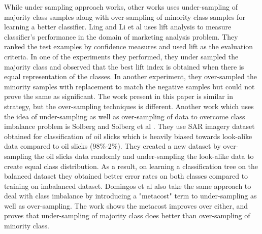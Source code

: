 \documentclass[10pt,journal,compsoc]{IEEEtran}
\begin{document}
While under sampling approach works, other works uses under-sampling of majority class samples along with over-sampling of minority class samples for learning a better classifier.
Ling and Li et al \cite{ll98} uses lift analysis to measure classifier's performance in the domain of marketing analysis problem.
They ranked the test examples by confidence measures and used lift as the evaluation criteria.
In one of the experiments they performed, they under sampled the majority class and observed that the best lift index is obtained when there is equal representation of the classes.
In another experiment, they over-sampled the minority samples with replacement to match the negative samples but could not prove the same as significant. 
The work present in this paper is similar in strategy, but the over-sampling techniques is different.
Another work which uses the idea of under-sampling as well as over-sampling of data to overcome class imbalance problem is Solberg and Solberg et al \cite{solberg96} .
They use SAR imagery dataset obtained for classification of oil slicks which is heavily biased towards look-alike data compared to oil slicks (98\%-2\%). 
They created a new dataset by over-sampling the oil slicks data randomly and under-sampling the look-alike data to create equal class distribution.
As a result, on learning a classification tree on the balanced dataset they obtained better error rates on both classes compared to training on imbalanced dataset.
Domingos et al \cite{domingos99} also take the same approach to deal with class imbalance by introducing a "metacost" term to under-sampling as well as over-sampling.
The work shows the metacost improves over either, and proves that under-sampling of majority class does better than over-sampling of minority class.
\end{document}
